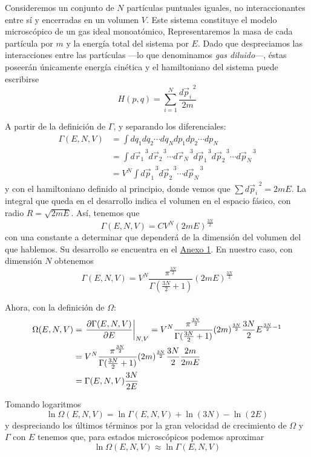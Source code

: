 Consideremos un conjunto de $N$ partículas puntuales iguales, no interaccionantes entre sí y encerradas en un volumen $V$. 
Este sistema constituye el modelo microscópico de un gas ideal monoatómico, Representaremos la masa de cada partícula por $m$ y la energía total del sistema por $E$. 
Dado que despreciamos las interacciones entre las partículas ---lo que denominamos \emph{gas diluido}---, éstas poseerán únicamente energía cinética y el hamiltoniano del sistema puede escribirse $$H(p,q) = \sum_{i=1}^{N} \frac{d{\vec{p}_{i}}^{\,2}}{2m}$$

A partir de la definición de $\Gamma$, y separando los diferenciales:
\begin{align}
	\Gamma(E,N,V) &= \int dq_1 dq_2 \cdots dq_N dp_1 dp_2 \cdots dp_N \nonumber \\
				  &= \int d{\vec{r}_{1}}^{\,3} d{\vec{r}_{2}}^{\,3} \cdots d{\vec{r}_{N}}^{\,3} d{\vec{p}_{1}}^{\,3} d{\vec{p}_{2}}^{\,3} \cdots d{\vec{p}_{N}}^{\,3} \\
				  &= V^N \int d{\vec{p}_{1}}^{\,3} d{\vec{p}_{2}}^{\,3} \cdots d{\vec{p}_{N}}^{\,3} \nonumber
\end{align}
y con el hamiltoniano definido al principio, donde vemos que $\sum d{\vec{p}_{i}}^{\,2} = 2mE$. 
La integral que queda en el desarrollo indica el volumen en el espacio fásico, con radio $R = \sqrt{2mE}$.
Así, tenemos que 
\begin{equation}
	\Gamma(E,N,V) = CV^N(2mE)^\frac{3N}{2}
\end{equation}
con una constante a determinar que dependerá de la dimensión del volumen del que hablemos. Su desarrollo se encuentra en el \hyperref[Anx1]{Anexo 1}. En nuestro caso, con dimensión $N$ obtenemos 
\begin{equation}
	\Gamma(E,N,V) = V^N\frac{\pi^{\frac{3N}{2}}}{\Gamma(\frac{3N}{2}+1)}(2mE)^\frac{3N}{2}
\end{equation}

Ahora, con la definición de $\Omega$:
\begin{align}
	\Omega(E,N,V) &= \eval{\pdv{\Gamma(E,N,V)}{E}}_{N,V} = V^N\frac{\pi^{\frac{3N}{2}}}{\Gamma(\frac{3N}{2}+1)}(2m)^\frac{3N}{2}\frac{3N}{2}E^{\frac{3N}{2}-1}  \nonumber\\
				  &= V^N\frac{\pi^{\frac{3N}{2}}}{\Gamma(\frac{3N}{2}+1)}(2m)^\frac{3N}{2}\frac{3N}{2}\frac{2m}{2mE} \\
				  &= \Gamma(E,N,V)\frac{3N}{2E}  \nonumber
\end{align}

Tomando logaritmos
\begin{equation}
	\ln \Omega(E,N,V) = \ln \Gamma(E,N,V) + \ln (3N) - \ln (2E)
\end{equation}
y despreciando los últimos términos por la gran velocidad de crecimiento de $\Omega$ y $\Gamma$ con $E$ tenemos que, para estados microscópicos podemos aproximar
\begin{equation}
	\boxed{\ln \Omega(E,N,V) \approx \ln \Gamma(E,N,V)}
\end{equation}

